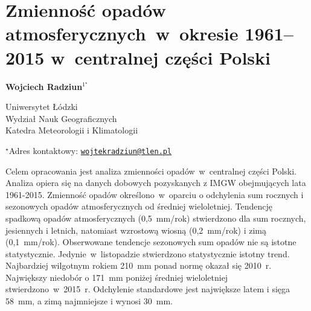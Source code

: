 \documentclass[\main/boa.tex]{subfiles}
\begin{document}
\sloppy


\section{Zmienność opadów atmosferycznych~w~okresie 1961--2015 w~centralnej części Polski}

\begin{center}
  {\bf {} Wojciech Radziun$^{1^\star}$}
\end{center}

\vskip 0.3cm

\begin{affiliations}
\begin{enumerate}
\begin{minipage}{0.915\textwidth}
\centering
\item Uniwersytet Łódzki \\ Wydział Nauk Geograficznych \\ Katedra Meteorologii i Klimatologii\\[-2pt]
\end{minipage}
\end{enumerate}
$^\star$Adres kontaktowy: \href{mailto:wojtekradziun@tlen.pl}{\nolinkurl{wojtekradziun@tlen.pl}}\\
\end{affiliations}

\vskip 0.5cm


\vskip 0.5cm

Celem opracowania jest analiza zmienności opadów~w~centralnej części Polski. Analiza opiera            się na danych dobowych pozyskanych z IMGW obejmujących lata 1961-2015. Zmienność opadów określono~w~oparciu o odchylenia  sum rocznych i sezonowych opadów atmosferycznych od średniej wieloletniej. Tendencję spadkową opadów atmosferycznych (0,5~mm/rok) stwierdzono dla sum rocznych, jesiennych i letnich, natomiast wzrostową wiosną (0,2~mm/rok) i zimą (0,1~mm/rok). Obserwowane tendencje sezonowych sum opadów nie są istotne statystycznie. Jedynie~w~listopadzie stwierdzono statystycznie istotny trend. Najbardziej wilgotnym rokiem 210~mm ponad normę okazał się 2010~r. Największy niedobór o 171~mm poniżej średniej wieloletniej stwierdzono~w~2015~r. Odchylenie standardowe jest największe latem i sięga 58~mm, a zimą najmniejsze i wynosi 30~mm.
\end{document}
